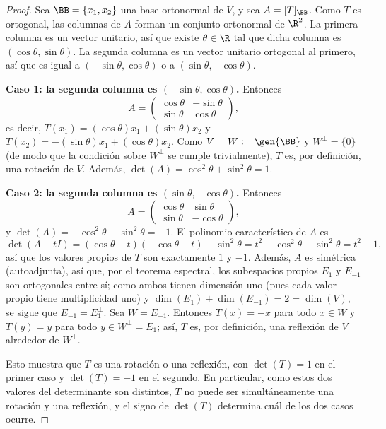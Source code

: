 \begin{proof}
    Sea $\BB=\{x_1,x_2\}$ una base ortonormal de $V$, y sea $A=[T]_{\BB}$. Como $T$ es ortogonal, las columnas de $A$ forman un conjunto ortonormal de $\R^2$. La primera columna es un vector unitario, así que existe $\theta\in\R$ tal que dicha columna es $(\cos\theta,\sin\theta)$. La segunda columna es un vector unitario ortogonal al primero, así que es igual a $(-\sin\theta,\cos\theta)$ o a $(\sin\theta,-\cos\theta)$.

    \textbf{Caso 1: la segunda columna es $(-\sin\theta,\cos\theta)$.} Entonces
    \begin{equation*}
        A=\begin{pmatrix}\cos\theta&-\sin\theta\\\sin\theta&\cos\theta\end{pmatrix},
    \end{equation*}
    es decir, $T(x_1)=(\cos\theta)x_1+(\sin\theta)x_2$ y $T(x_2)=-(\sin\theta)x_1+(\cos\theta)x_2$. Como $V=W:=\gen{\BB}$ y $W^\perp=\{0\}$ (de modo que la condición sobre $W^\perp$ se cumple trivialmente), $T$ es, por definición, una rotación de $V$. Además, $\det(A)=\cos^2\theta+\sin^2\theta=1$.

    \textbf{Caso 2: la segunda columna es $(\sin\theta,-\cos\theta)$.} Entonces
    \begin{equation*}
        A=\begin{pmatrix}\cos\theta&\sin\theta\\\sin\theta&-\cos\theta\end{pmatrix},
    \end{equation*}
    y $\det(A)=-\cos^2\theta-\sin^2\theta=-1$. El polinomio característico de $A$ es
    \begin{equation*}
        \det(A-tI)=(\cos\theta-t)(-\cos\theta-t)-\sin^2\theta=t^2-\cos^2\theta-\sin^2\theta=t^2-1,
    \end{equation*}
    así que los valores propios de $T$ son exactamente $1$ y $-1$. Además, $A$ es simétrica (autoadjunta), así que, por el teorema espectral, los subespacios propios $E_1$ y $E_{-1}$ son ortogonales entre sí; como ambos tienen dimensión uno (pues cada valor propio tiene multiplicidad uno) y $\dim(E_1)+\dim(E_{-1})=2=\dim(V)$, se sigue que $E_{-1}=E_1^\perp$. Sea $W=E_{-1}$. Entonces $T(x)=-x$ para todo $x\in W$ y $T(y)=y$ para todo $y\in W^\perp=E_1$; así, $T$ es, por definición, una reflexión de $V$ alrededor de $W^\perp$.

    Esto muestra que $T$ es una rotación o una reflexión, con $\det(T)=1$ en el primer caso y $\det(T)=-1$ en el segundo. En particular, como estos dos valores del determinante son distintos, $T$ no puede ser simultáneamente una rotación y una reflexión, y el signo de $\det(T)$ determina cuál de los dos casos ocurre.
\end{proof}

